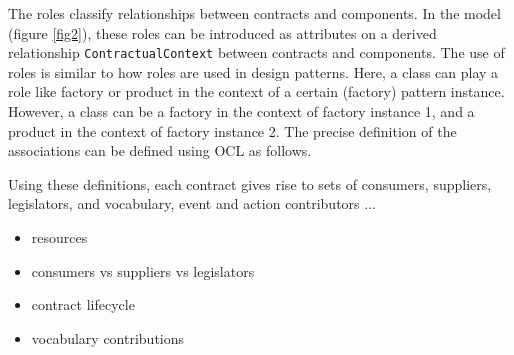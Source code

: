 \documentclass{llncs}
\begin{document}
The roles classify relationships between contracts and components. In the model (figure \ref{fig2}), these roles can be introduced as attributes on a derived relationship \texttt{ContractualContext} between contracts and components. The use of roles is similar to how roles are used in design patterns. Here, a class can play a role like factory or product in the context of a certain (factory) pattern instance. However, a class can be a factory in the context of factory instance 1, and a product in the context of factory instance 2. The precise definition of the associations can be defined using OCL as follows. 




Using these definitions, each contract gives rise to sets of consumers, suppliers, legislators, and vocabulary, event and action contributors ...




\begin{itemize}
\item resources
\item consumers vs suppliers vs legislators
\item contract lifecycle
\item vocabulary contributions
\end{itemize}
\end{document}
